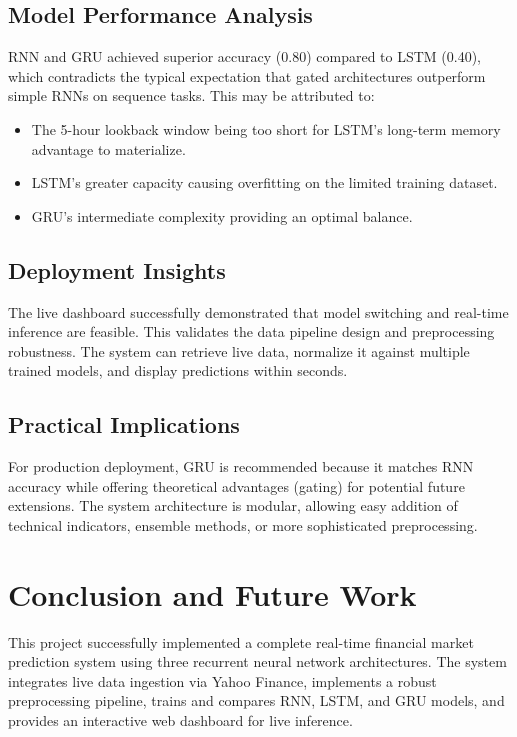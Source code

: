 \documentclass[conference]{IEEEtran}
\begin{document}
\subsection{Model Performance Analysis}
RNN and GRU achieved superior accuracy (0.80) compared to LSTM (0.40), which contradicts the typical expectation that gated architectures outperform simple RNNs on sequence tasks. This may be attributed to:

\begin{itemize}
    \item The 5-hour lookback window being too short for LSTM's long-term memory advantage to materialize.
    \item LSTM's greater capacity causing overfitting on the limited training dataset.
    \item GRU's intermediate complexity providing an optimal balance.
\end{itemize}

\subsection{Deployment Insights}
The live dashboard successfully demonstrated that model switching and real-time inference are feasible. This validates the data pipeline design and preprocessing robustness. The system can retrieve live data, normalize it against multiple trained models, and display predictions within seconds.

\subsection{Practical Implications}
For production deployment, GRU is recommended because it matches RNN accuracy while offering theoretical advantages (gating) for potential future extensions. The system architecture is modular, allowing easy addition of technical indicators, ensemble methods, or more sophisticated preprocessing.

\section{Conclusion and Future Work}

This project successfully implemented a complete real-time financial market prediction system using three recurrent neural network architectures. The system integrates live data ingestion via Yahoo Finance, implements a robust preprocessing pipeline, trains and compares RNN, LSTM, and GRU models, and provides an interactive web dashboard for live inference.
\end{document}
